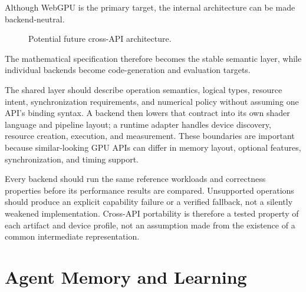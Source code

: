 \documentclass[11pt,a4paper,oneside]{report}
\begin{document}
Although WebGPU is the primary target, the internal architecture can be made backend-neutral.

\begin{figure}[H]
\centering
{}
\caption{Potential future cross-API architecture.}
\end{figure}

The mathematical specification therefore becomes the stable semantic layer, while individual
backends become code-generation and evaluation targets.

The shared layer should describe operation semantics, logical types, resource intent, synchronization
requirements, and numerical policy without assuming one API's binding syntax. A backend then lowers
that contract into its own shader language and pipeline layout; a runtime adapter handles device
discovery, resource creation, execution, and measurement. These boundaries are important because
similar-looking GPU APIs can differ in memory layout, optional features, synchronization, and
timing support.

Every backend should run the same reference workloads and correctness properties before its
performance results are compared. Unsupported operations should produce an explicit capability
failure or a verified fallback, not a silently weakened implementation. Cross-API portability is
therefore a tested property of each artifact and device profile, not an assumption made from the
existence of a common intermediate representation.

\chapter{Agent Memory and Learning}
\end{document}
